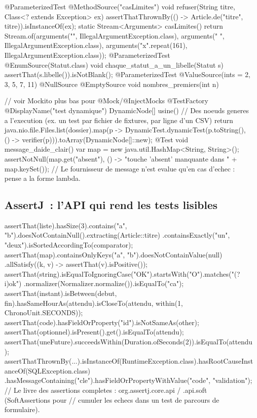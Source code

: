 \documentclass[12pt,a4paper,twoside,openright]{book}
\begin{document}
\begin{codejava}
{    @ParameterizedTest @MethodSource("casLimites")
    void refuser(String titre, Class<? extends Exception> ex) {
        assertThatThrownBy(() -> Article.de("titre", titre)).isInstanceOf(ex);
    }
    static Stream<Arguments> casLimites() {
        return Stream.of(arguments("", IllegalArgumentException.class),
                          arguments("  ", IllegalArgumentException.class),
                          arguments("x".repeat(161), IllegalArgumentException.class));
    }
    @ParameterizedTest @EnumSource(Statut.class)
    void chaque_statut_a_un_libelle(Statut s) { assertThat(s.libelle()).isNotBlank(); }
    @ParameterizedTest @ValueSource(ints = {2, 3, 5, 7, 11}) @NullSource @EmptySource
    void nombres_premiers(int n) { }

    // voir Mockito plus bas pour @Mock/@InjectMocks
    @TestFactory @DisplayName("test dynamique") DynamicNode[] usine() {
        // Des noeuds generes a l'execution (ex. un test par fichier de fixtures, par ligne d'un CSV)
        return java.nio.file.Files.list(dossier).map(p ->
                DynamicTest.dynamicTest(p.toString(), () -> verifier(p))).toArray(DynamicNode[]::new);
    }
    @Test void message_daide_clair() {
        var map = new java.util.HashMap<String, String>();
        assertNotNull(map.get("absent"), () -> "touche 'absent' manquante dans " + map.keySet());
        // Le fournisseur de message n'est evalue qu'en cas d'echec : pense a la forme lambda.
    }
}
\end{codejava}

\subsection{AssertJ~: l'API qui rend les tests lisibles}

\begin{codejava}
assertThat(liste).hasSize(3).contains("a", "b").doesNotContainNull().extracting(Article::titre)
        .containsExactly("un", "deux").isSortedAccordingTo(comparator);
assertThat(map).containsOnlyKeys("a", "b").doesNotContainValue(null)
        .allSatisfy((k, v) -> assertThat(v).isPositive());
assertThat(string).isEqualToIgnoringCase("OK").startsWith("O").matches("(?i)ok")
        .normalizer(Normalizer.normalize()).isEqualTo("ca");
assertThat(instant).isBetween(debut, fin).hasSameHourAs(attendu).isCloseTo(attendu, within(1, ChronoUnit.SECONDS));
assertThat(code).hasFieldOrProperty("id").isNotSameAs(other);
assertThat(optionnel).isPresent().get().isEqualTo(attendu);
assertThat(uneFuture).succeedsWithin(Duration.ofSeconds(2)).isEqualTo(attendu);
assertThatThrownBy(...).isInstanceOf(RuntimeException.class).hasRootCauseInstanceOf(SQLException.class)
        .hasMessageContaining("cle").hasFieldOrPropertyWithValue("code", "validation");
// Le livre des assertions completes : org.assertj.core.api / .api.soft (SoftAssertions pour
// cumuler les echecs dans un test de parcours de formulaire).
\end{codejava}
\end{document}
